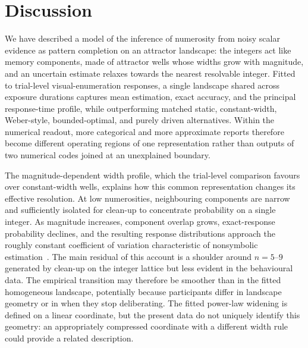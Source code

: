 \documentclass[Afour,sageh,times]{sagej}
\newif\ifmarkrevisions
\newcommand{\revised}[1]{\ifmarkrevisions{\color{red}#1}\else#1\fi}
\begin{document}
\section{Discussion}

We have described a model of the inference of numerosity from noisy scalar evidence as pattern completion on an attractor landscape: the integers act like memory components, made of attractor wells whose widths grow with magnitude, and an uncertain estimate relaxes towards the nearest resolvable integer. Fitted to trial-level visual-enumeration responses, a single landscape shared across exposure durations captures mean estimation, exact accuracy, and the principal response-time profile, while outperforming matched static, constant-width, Weber-style, bounded-optimal, and purely driven alternatives. Within the numerical readout, more categorical and more approximate reports therefore become different operating regions of one representation rather than outputs of two numerical codes joined at an unexplained boundary.

The magnitude-dependent width profile\revised{, which the trial-level comparison favours over constant-width wells,} explains how this common representation changes its effective resolution. At low numerosities, neighbouring components are narrow and sufficiently isolated for clean-up to concentrate probability on a single integer. As magnitude increases, component overlap grows, exact-response probability declines, and the resulting response distributions approach the roughly constant coefficient of variation characteristic of nonsymbolic estimation~\citep{whalen_nonverbal_1999,cordes_variability_2001,testolin_estimates_2021}. The main residual of this account is a shoulder around $n=5$--$9$ generated by clean-up on the integer lattice but less evident in the behavioural data. The empirical transition may therefore be smoother than in the fitted homogeneous landscape, potentially because participants differ in landscape geometry or in when they stop deliberating. The fitted power-law widening is defined on a linear coordinate, but the present data do not uniquely identify this geometry: an appropriately compressed coordinate with a different width rule could provide a related description.
\end{document}
